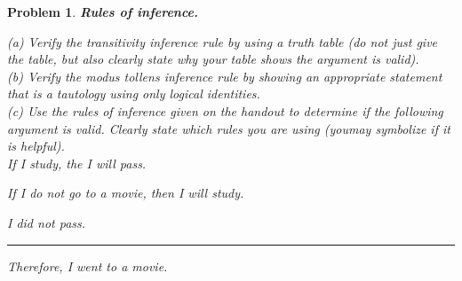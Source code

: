 \documentclass{article}
\newtheorem{problem}{Problem}
\theoremstyle{definition}
\begin{document}
\begin{problem}
\textbf{Rules of inference.}

(a) Verify the transitivity inference rule by using a truth table (do not just give the table, but also clearly state why your table shows the argument is valid).\\

(b) Verify the modus tollens inference rule by showing an appropriate statement that is a tautology using only logical identities.\\

(c) Use the rules of inference given on the handout to determine if the following argument is valid. Clearly state which rules you are using (youmay symbolize if it is helpful).\\

	If I study, the I will pass.
	
	If I do not go to a movie, then I will study.
	
	I did not pass.\\
	\noindent\rule{8cm}{0.4pt}
	
	Therefore, I went to a movie.\\\\

\end{problem}
\end{document}
